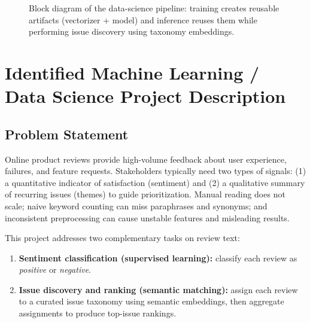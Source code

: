 \documentclass[12pt]{article}
\begin{document}
\begin{figure}[H]
  \caption{Block diagram of the data-science pipeline: training creates reusable artifacts (vectorizer + model) and inference reuses them while performing issue discovery using taxonomy embeddings.}
\end{figure}

\section{Identified Machine Learning / Data Science Project Description}
\subsection{Problem Statement}
Online product reviews provide high-volume feedback about user experience, failures, and feature requests. Stakeholders typically need two types of signals: (1) a quantitative indicator of satisfaction (sentiment) and (2) a qualitative summary of recurring issues (themes) to guide prioritization. Manual reading does not scale; naive keyword counting can miss paraphrases and synonyms; and inconsistent preprocessing can cause unstable features and misleading results.

This project addresses two complementary tasks on review text:
\begin{enumerate}[label=(\arabic*)]
  \item \textbf{Sentiment classification (supervised learning):} classify each review as \emph{positive} or \emph{negative}.
  \item \textbf{Issue discovery and ranking (semantic matching):} assign each review to a curated issue taxonomy using semantic embeddings, then aggregate assignments to produce top-issue rankings.
\end{enumerate}
\end{document}
